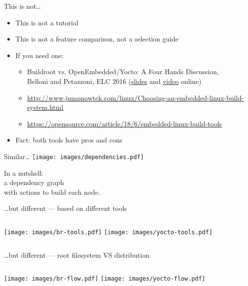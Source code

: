 \documentclass[xetex,table,aspectratio=169]{beamer}
\newcommand{\bg}[1]{
  \usebackgroundtemplate{
    \texttt{[image: images/bg-\#1.png]}
  }
}
\begin{document}
\begin{frame}{This is not\dots}
  \begin{itemize}
  \item This is not a tutorial
  \pause
  \item This is not a feature comparison, not a selection guide
  \pause
  \item If you need one:
    \begin{itemize}
    \item Buildroot vs. OpenEmbedded/Yocto: A Four Hands
      Discussion,\\ Belloni and Petazzoni, ELC 2016
      (\href{https://elinux.org/images/7/7a/Bellonipetazzoni.pdf}{slides}
      and \href{https://www.youtube.com/watch?v=13LZ0szWSVg}{video}
      online)
    \item
      \url{http://www.jumpnowtek.com/linux/Choosing-an-embedded-linux-build-system.html}
    \item
      \url{https://opensource.com/article/18/6/embedded-linux-build-tools}
    \end{itemize}
  \pause
  \item Fact: both tools have pros and cons
  \end{itemize}
\end{frame}

\bg{both}
\begin{frame}{Similar\dots}
  \center\texttt{[image: images/dependencies.pdf]}

  In a nutshell:\\
  a dependency graph\\
  with actions to build each node.
\end{frame}

\begin{frame}{\dots but different --- based on different tools}
  \begin{columns}
    \center\texttt{[image: images/br-tools.pdf]}
    \center\texttt{[image: images/yocto-tools.pdf]}
  \end{columns}
\end{frame}

\begin{frame}{\dots but different --- root filesystem VS distribution}
  \begin{columns}
    \center\texttt{[image: images/br-flow.pdf]}
    \center\texttt{[image: images/yocto-flow.pdf]}
  \end{columns}
\end{frame}
\end{document}
